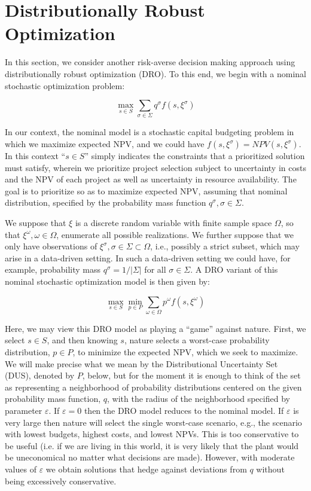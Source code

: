 \section{Distributionally Robust Optimization}
\label{sec:DROCapitalBudgeting}

In this section, we consider another risk-averse decision making approach
using distributionally robust optimization (DRO). To this end, we begin with
a nominal stochastic optimization problem:

\begin{equation}
\max_{s\in S} \sum_{\sigma\in \Sigma} q^\sigma f(s,\xi^\sigma)
\end{equation}

In our context, the nominal model is a stochastic capital budgeting problem
in which we maximize expected NPV, and we could have
$f(s,\xi^\sigma)=NPV(s,\xi^\sigma)$. In this context ``$s\in S$'' simply
indicates the constraints that a prioritized solution must satisfy, wherein
we prioritize project selection subject to uncertainty in costs and the NPV
of each project as well as uncertainty in resource availability. The goal is
to prioritize so as to maximize expected NPV, assuming that nominal distribution,
specified by the probability mass function $q^\sigma, \sigma \in \Sigma$.

We suppose that $\xi$ is a discrete random variable with finite sample space $\Omega$,
so that $\xi^\omega, \omega \in \Omega$, enumerate all possible realizations.
We further suppose that we only have observations of
$\xi^\sigma, \sigma \in \Sigma \subset \Omega$,
i.e., possibly a strict subset, which may arise in a data-driven setting. In such a
data-driven setting we could have, for example, probability mass $q^\sigma = 1/|\Sigma|$
for all $\sigma \in \Sigma$.
A DRO variant of this nominal stochastic optimization model is then given by:

\begin{equation}
\max_{s\in S} \min_{p\in P} \sum_{\omega\in \Omega} p^\omega f(s,\xi^\omega)
\end{equation}

Here, we may view this DRO model as playing a ``game'' against nature. First, we select
$s\in S$, and then knowing $s$, nature selects a worst-case probability distribution,
$p\in P$, to minimize the expected NPV, which we seek to maximize. We will make precise
what we mean by the Distributional Uncertainty Set (DUS), denoted by $P$, below, but
for the moment it is enough to think of the set as representing a neighborhood of
probability distributions centered on the given probability mass function, $q$,
with the radius of the neighborhood specified by parameter $\varepsilon$. If
$\varepsilon = 0$ then the DRO model reduces to the nominal model. If $\varepsilon$ is very
large then nature will select the single worst-case scenario, e.g., the scenario
with lowest budgets, highest costs, and lowest NPVs. This is too conservative to be useful
(i.e. if we are living in this world, it is very likely that the plant would be
uneconomical no matter what decisions are made). However, with moderate values of
$\varepsilon$ we obtain solutions that hedge against deviations from $q$ without being
excessively conservative.

